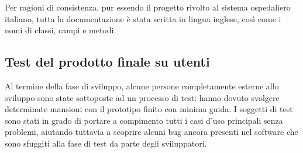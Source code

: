 \documentclass{article}
\begin{document}
Per ragioni di consistenza, pur essendo il progetto rivolto al sistema ospedaliero italiano, tutta la documentazione è stata scritta in lingua inglese, così come i nomi di classi, campi e metodi.

\subsection{Test del prodotto finale su utenti}

Al termine della fase di sviluppo, alcune persone completamente esterne allo sviluppo sono state sottoposte ad un processo di test: hanno dovuto svolgere determinate mansioni con il prototipo finito con minima guida. I soggetti di test sono stati in grado di portare a compimento tutti i casi d'uso principali senza problemi, aiutando tuttavia a scoprire alcuni bug ancora presenti nel software che sono sfuggiti alla fase di test da parte degli sviluppatori.

\newpage
\end{document}
